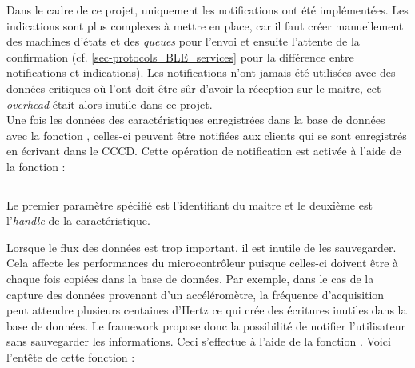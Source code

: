 Dans le cadre de ce projet, uniquement les notifications ont été implémentées. Les indications sont plus complexes à mettre en place, car il faut créer manuellement des machines d'états et des \textit{queues} pour l'envoi et ensuite l'attente de la confirmation (cf. \cref{sec-protocols_BLE_services} pour la différence entre notifications et indications). Les notifications n'ont jamais été utilisées avec des données critiques où l'ont doit être sûr d'avoir la réception sur le maitre, cet \textit{overhead} était alors inutile dans ce projet.\\

Une fois les données des caractéristiques enregistrées dans la base de données avec la fonction , celles-ci peuvent être notifiées aux clients qui se sont enregistrés en écrivant dans le CCCD. Cette opération de notification est activée à l'aide de la fonction  : 

\begin{tcolorbox}
  [top=-1mm, bottom=-3mm, left=0mm, right=0mm, enhanced,breakable,
  attach boxed title to top center={yshift=-3mm,yshifttext=-1mm},colback=LightGray,colframe=DarkGray,
  colbacktitle=DarkGray, fonttitle=\footnotesize\bfseries,boxed title style={size=small,colframe=DarkGray},
  title=\texttt{gatt\_server\_interface.h} ]
\inputminted[firstline=268,lastline=272,bgcolor=LightGray,fontsize=\footnotesize,breaklines,linenos]{C}{SourceCode/gatt_server_interface.h}
\end{tcolorbox}

Le premier paramètre spécifié est l'identifiant du maitre et le deuxième est l'\textit{handle} de la caractéristique. 

Lorsque le flux des données est trop important, il est inutile de les sauvegarder. Cela affecte les performances du microcontrôleur puisque celles-ci doivent être à chaque fois copiées dans la base de données. Par exemple, dans le cas de la capture des données provenant d'un accéléromètre, la fréquence d'acquisition peut attendre plusieurs centaines d'Hertz ce qui crée des écritures inutiles dans la base de données. Le framework propose donc la possibilité de notifier l'utilisateur sans sauvegarder les informations. Ceci s'effectue à l'aide de la fonction . Voici l'entête de cette fonction : 

\begin{tcolorbox}
  [top=-1mm, bottom=-3mm, left=0mm, right=0mm, enhanced,breakable,
  attach boxed title to top center={yshift=-3mm,yshifttext=-1mm},colback=LightGray,colframe=DarkGray,
  colbacktitle=DarkGray, fonttitle=\footnotesize\bfseries,boxed title style={size=small,colframe=DarkGray},
  title=\texttt{gatt\_server\_interface.h} ]
\inputminted[firstline=302,lastline=308,bgcolor=LightGray,fontsize=\footnotesize,breaklines,linenos]{C}{SourceCode/gatt_server_interface.h}
\end{tcolorbox}

